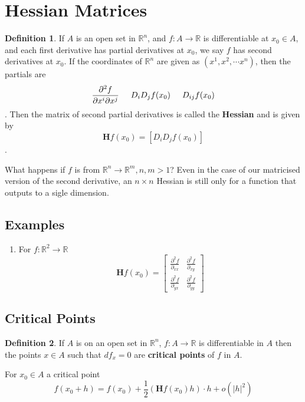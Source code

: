 \documentclass[12pt]{article}
\newcommand{\R}{\mathbb{R}}
\theoremstyle{definition}
\newtheorem{definition}{Definition}[section]
\theoremstyle{remark}
\newenvironment{question}[2][QUESTION]{\begin{trivlist}
\item[\hskip \labelsep {\bfseries #1}\hskip \labelsep {\bfseries #2.}]}{\end{trivlist}}
\begin{document}
\section{Hessian Matrices}
\begin{definition}
    If $A$ is an open set in $\R^n$, and $f:A\to\R$ is differentiable at $x_0\in A$, and each first derivative has partial derivatives at $x_0$, we say $f$ has second derivatives at $x_0$. If the coordinates of $\R^n$ are given as $(x^1,x^2,\cdots x^n)$, then the partials are 
    $$\frac{\partial ^2 f}{\partial x^i\partial x^j}\hspace{.5cm}D_iD_jf(x_0)\hspace{.5cm}D_{ij}f(x_0)$$.
    Then the matrix of second partial derivatives is called the \textbf{Hessian} and is given by $$\textbf{H}f(x_0)=\left[D_iD_jf(x_0)\right]$$.
\end{definition}
\begin{question}{8}
    What happens if $f$ is from $\R^n\to\R^m, n,m > 1$? Even in the case of our matricised version of the second derivative, an $n\times n$ Hessian is still only for a function that outputs to a sigle dimension.\vspace{2in}
\end{question}
    
\subsection{Examples}
\begin{enumerate}
    \item For $f:\R^2\to\R$ 
    $$\textbf{H}f(x_0)=\begin{bmatrix}
       \frac{\partial^2f}{\partial_{xx}} &  \frac{\partial^2f}{\partial_{xy}}\\
       \frac{\partial^2f}{\partial_{yx}} & \frac{\partial^2f}{\partial_{yy}}
    \end{bmatrix}$$
\end{enumerate}

\subsection{Critical Points}
\begin{definition}
    If $A$ is on an open set in $\R^n$, $f:A\to\R$ is differentiable in $A$ then the points $x\in A$ such that $df_x=0$ are \textbf{critical points} of $f$ in $A$.
\end{definition}

For $x_0\in A$ a critical point $$f(x_0+h)=f(x_0)+\frac{1}{2}(\textbf{H}f(x_0)h)\cdot h + o(|h|^2)$$
\end{document}
